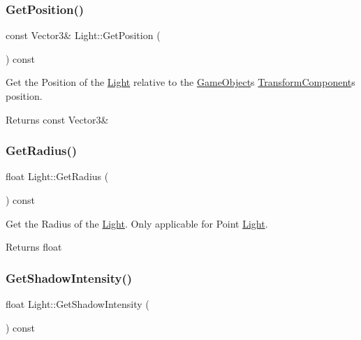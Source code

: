 \subsubsection{\texorpdfstring{Get\+Position()}{GetPosition()}}
{\footnotesize\ttfamily const Vector3\& Light\+::\+Get\+Position (\begin{DoxyParamCaption}{ }\end{DoxyParamCaption}) const\hspace{0.3cm}{\ttfamily [inline]}}



Get the Position of the \hyperlink{classLight}{Light} relative to the \hyperlink{classGameObject}{Game\+Object}\textquotesingle{}s \hyperlink{classTransformComponent}{Transform\+Component}\textquotesingle{}s position. 

\begin{DoxyReturn}{Returns}
const Vector3\& 
\end{DoxyReturn}
\mbox{\label{classLight_acba7192fae5c7f97f41c12fb9773145c}} 
\subsubsection{\texorpdfstring{Get\+Radius()}{GetRadius()}}
{\footnotesize\ttfamily float Light\+::\+Get\+Radius (\begin{DoxyParamCaption}{ }\end{DoxyParamCaption}) const}



Get the Radius of the \hyperlink{classLight}{Light}. Only applicable for Point \hyperlink{classLight}{Light}. 

\begin{DoxyReturn}{Returns}
float 
\end{DoxyReturn}
\mbox{\label{classLight_af2cd275417fec333fecadb28180805ca}} 
\subsubsection{\texorpdfstring{Get\+Shadow\+Intensity()}{GetShadowIntensity()}}
{\footnotesize\ttfamily float Light\+::\+Get\+Shadow\+Intensity (\begin{DoxyParamCaption}{ }\end{DoxyParamCaption}) const\hspace{0.3cm}{\ttfamily [inline]}}



